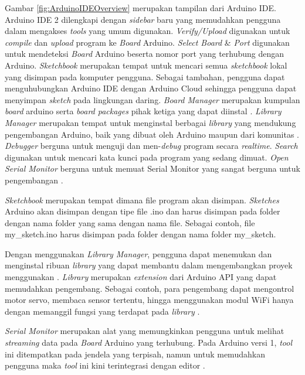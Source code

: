 Gambar \ref{fig:ArduinoIDEOverview} merupakan tampilan dari Arduino IDE. Arduino IDE 2 dilengkapi dengan \emph{sidebar} baru yang memudahkan pengguna dalam mengakses \emph{tools} yang umum digunakan. \emph{Verify/Upload} digunakan untuk \emph{compile} dan \emph{upload} program ke \emph{Board} Arduino. \emph{Select Board} \& \emph{Port} digunakan untuk mendeteksi \emph{Board} Arduino beserta nomor port yang terhubung dengan Arduino. \emph{Sketchbook} merupakan tempat untuk mencari semua \emph{sketchbook} lokal yang disimpan pada komputer pengguna. Sebagai tambahan, pengguna dapat menguhubungkan Arduino IDE dengan Arduino Cloud sehingga pengguna dapat menyimpan \emph{sketch} pada lingkungan daring. \emph{Board Manager} merupakan kumpulan \emph{board} arduino serta \emph{board packages} pihak ketiga yang dapat diinstal \parencite{Söderby_Hylén_2023b}. \emph{Library Manager} merupakan tempat untuk menginstal berbagai \emph{library} yang mendukung pengembangan Arduino, baik yang dibuat oleh Arduino maupun dari komunitas \parencite{Söderby_Hylén_2023c}. \emph{Debugger} berguna untuk menguji dan men-\emph{debug} program secara \emph{realtime}. \emph{Search} digunakan untuk mencari kata kunci pada program yang sedang dimuat. \emph{Open Serial Monitor} berguna untuk memuat Serial Monitor yang sangat berguna untuk pengembangan \parencite{Söderby_2023}.

\emph{Sketchbook} merupakan tempat dimana file program akan disimpan. \emph{Sketches} Arduino akan disimpan dengan tipe file .ino dan harus disimpan pada folder dengan nama folder yang sama dengan nama file. Sebagai contoh, file my\_sketch.ino harus disimpan pada folder dengan nama folder my\_sketch.

Dengan menggunakan \emph{Library Manager}, pengguna dapat menemukan dan menginstal ribuan \emph{library} yang dapat membantu dalam mengembangkan proyek menggunakan . \emph{Library} merupakan \emph{extension} dari Arduino API yang dapat memudahkan pengembang. Sebagai contoh, para pengembang dapat mengontrol motor servo, membaca sensor tertentu, hingga menggunakan modul WiFi hanya dengan memanggil fungsi yang terdapat pada \emph{library} \parencite{Söderby_Hylén_2023c}.

\emph{Serial Monitor} merupakan alat yang memungkinkan pengguna untuk melihat \emph{streaming} data pada \emph{Board} Arduino yang terhubung. Pada Arduino versi 1, \emph{tool} ini ditempatkan pada jendela yang terpisah, namun untuk memudahkan pengguna maka \emph{tool} ini kini terintegrasi dengan editor \parencite{Söderby_2023}. 

